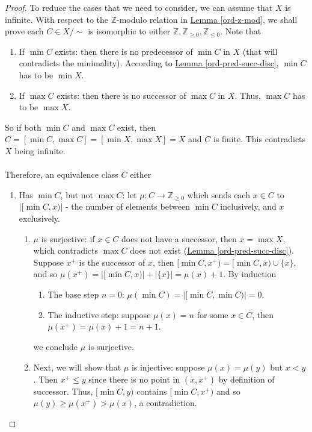 \documentclass{treatise}
\begin{document}
\begin{proof}
To reduce the cases that we need to consider, we can assume that $X$ is infinite. With respect to the $\mathbb{Z}$-modulo relation in \hyperref[ord-z-mod]{Lemma \ref*{ord-z-mod}}, we shall prove each $C \in X / \sim$ is isomorphic to either $\mathbb{Z}, \mathbb{Z}_{\geq 0}, \mathbb{Z}_{\leq 0}$. Note that
\begin{enumerate}
    \item If $\min C$ exists: then there is no predecessor of $\min C$ in $X$ (that will contradicts the minimality). According to \hyperref[ord-pred-succ-disc]{Lemma \ref*{ord-pred-succ-disc}}, $\min C$ has to be $\min X$.
    \item If $\max C$ exists: then there is no successor of $\max C$ in $X$. Thus, $\max C$ has to be $\max X$.
\end{enumerate}
So if both $\min C$ and $\max C$ exist, then $C = [\min C, \max C] = [\min X, \max X] = X$ and $C$ is finite. This contradicts $X$ being infinite.
\\
\\
Therefore, an equivalence class $C$ either
\begin{enumerate}
    \item Has $\min C$, but not $\max C$: let $\mu: C \to \mathbb{Z}_{\geq 0}$ which sends each $x \in C$ to $|[\min C, x)|$ - the number of elements between $\min C$ inclusively, and $x$ exclusively.
    \begin{enumerate}
        \item $\mu$ is surjective: if $x \in C$ does not have a successor, then $x = \max X$, which contradicts $\max C$ does not exist (\hyperref[ord-pred-succ-disc]{Lemma \ref*{ord-pred-succ-disc}}). Suppose $x^+$ is the successor of $x$, then $[\min C, x^+) = [\min C, x) \cup \{ x \}$, and so $\mu(x^+) = |[\min C, x)| + |\{ x \}| = \mu(x) + 1$. By induction
        \begin{enumerate}
            \item The base step $n = 0$: $\mu(\min C) = |[\min C, \min C)| = 0$.
            \item The inductive step: suppose $\mu(x) = n$ for some $x \in C$, then $\mu(x^+) = \mu(x) + 1 = n + 1$.
        \end{enumerate}
        we conclude $\mu$ is surjective.
        \item Next, we will show that $\mu$ is injective: suppose $\mu(x) = \mu(y)$ but $x < y$. Then $x^+ \leq y$ since there is no point in $(x, x^+)$ by definition of successor. Thus, $[\min C, y)$ contains $[\min C, x^+)$ and so $\mu(y) \geq \mu(x^+) > \mu(x)$, a contradiction.

\end{enumerate}
\end{enumerate}
\end{proof}
\end{document}
